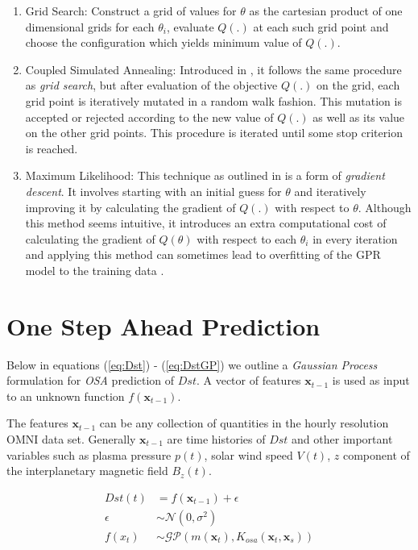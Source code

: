\begin{enumerate}
\item Grid Search: Construct a grid of values for $\theta$ as the cartesian product of one dimensional grids for each $\theta_i$, evaluate $Q(.)$ at each such grid point and choose the configuration which yields minimum value of $Q(.)$.

\item Coupled Simulated Annealing: Introduced in \cite{Xavier-De-Souza2010}, it follows the same procedure as \emph{grid search}, but after evaluation of the objective $Q(.)$ on the grid, each grid point is iteratively mutated in a random walk fashion. This mutation is accepted or rejected according to the new value of $Q(.)$ as well as its value on the other grid points. This procedure is iterated until some stop criterion is reached.

\item Maximum Likelihood: This technique as outlined in \cite{Rasmussen:2005:GPM:1162254} is a form of \emph{gradient descent}. It involves starting with an initial guess for $\theta$ and iteratively improving it by calculating the gradient of $Q(.)$ with respect to $\theta$. Although this method seems intuitive, it introduces an extra computational cost of calculating the gradient of $Q(\theta)$ with respect to each $\theta_i$ in every iteration and applying this method can sometimes lead to overfitting of the GPR model to the training data \cite{Rasmussen:2005:GPM:1162254}.

\end{enumerate}

\section{One Step Ahead Prediction} \label{sec:osa}

Below in equations (\ref{eq:Dst}) - (\ref{eq:DstGP}) we outline a \emph{Gaussian Process} formulation for \emph{OSA} prediction of $Dst$. A vector of features $\mathbf{x}_{t-1}$ is used as input to an unknown function $f(\mathbf{x}_{t-1})$.

The features $\mathbf{x}_{t-1}$ can be any collection of quantities in the hourly resolution OMNI data set. Generally $\mathbf{x}_{t-1}$ are time histories of $Dst$ and other important variables such as plasma pressure $p(t)$, solar wind speed $V(t)$, $z$ component of the interplanetary magnetic field $B_z(t)$.


\begin{align}
    Dst(t) & =  f(\mathbf{x}_{t-1}) + \epsilon \label{eq:Dst} \\
    \epsilon & \sim  \mathcal{N}(0, \sigma^2) \label{eq:GPNoise} \\
    f(x_t) & \sim  \mathcal{GP}(m(\mathbf{x}_t), K_{osa}(\mathbf{x}_t, \mathbf{x}_s)) \label{eq:DstGP} \\
\end{align}

